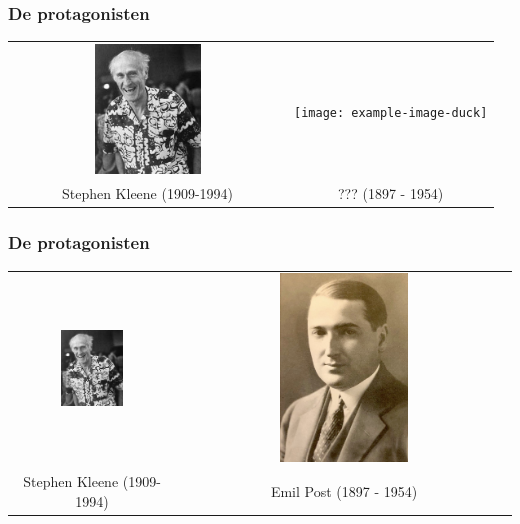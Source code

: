\documentclass{beamer}
\begin{document}
\begin{frame}
    \frametitle{De protagonisten}
    \begin{tabular*}{\textwidth}{c c}
        \includegraphics[width=0.4\textwidth]{Kleene.jpeg} & \texttt{[image: example-image-duck]} \\
        {\large Stephen Kleene} (1909-1994) & {\large ???} (1897 - 1954)\\
    \end{tabular*}
\end{frame}

\begin{frame}
    \frametitle{De protagonisten}
    \begin{tabular*}{\textwidth}{c c}
        \includegraphics[width=0.4\textwidth]{Kleene.jpeg} & \includegraphics[width=0.4\textwidth]{Post.jpg} \\
        {\large Stephen Kleene} (1909-1994) & {\large Emil Post} (1897 - 1954)\\
    \end{tabular*}
\end{frame}
\end{document}
